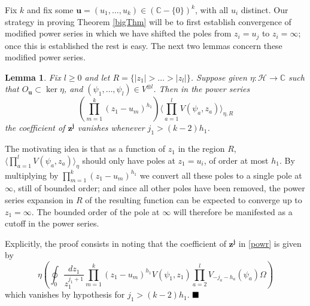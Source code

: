 \documentclass[a4paper,12pt]{article}
\newcommand{\C}{{\mathbb C}}
\newcommand{\uu}{{\mathbf u}}
\newcommand{\jj}{{\mathbf j}}
\newcommand{\zz}{{\mathbf z}}
\newcommand{\F}{{\mathcal H}}
\newcommand{\abs}[1]{\lvert#1\rvert}
\newcommand{\IP}[1]{\langle#1\rangle}
\newcommand{\done}{$\hfill \hfill \blacksquare$ \bigskip}
\newcommand{\ci}{\oint}
\newtheorem{lem}[defn]{Lemma}
\newcommand{\oproof}[1]{\noindent {\bf Proof#1.\ }}
\begin{document}
Fix $k$ and fix some $\uu = (u_1, \dots, u_k) \in (\C-\{0\})^k$, with all $u_i$ distinct.  Our strategy in proving
Theorem \ref{bigThm} will be to first establish convergence of modified power series
in which we have shifted the poles from $z_i = u_j$ to $z_i = \infty$; once this is established the rest
is easy.  The next two lemmas concern these modified power series.

\begin{lem} \label{pL} Fix $l \ge 0$ and let $R = \{\abs{z_1} > \dots > \abs{z_l}\}$.  Suppose given $\eta: \F \to \C$ such that $O_\uu \subset \ker \eta$, and
$(\psi_1, \dots, \psi_l) \in V^{\otimes l}$.  Then in the power series
\begin{equation} \label{powr}
\left( \prod_{m=1}^k (z_1 - u_m)^{h_1} \right) \IP{\prod_{a=1}^l V(\psi_a, z_a)}_{\eta,R}
\end{equation}
the coefficient of $\zz^\jj$ vanishes whenever $j_1 > (k-2) h_1$.
\end{lem}
\oproof{} The motivating idea is that as a function of $z_1$ in the region $R$,
$\IP{\prod_{a=1}^l V(\psi_a, z_a)}_\eta$ should only have poles at $z_1 = u_i$, of order at 
most $h_1$.  By multiplying by $\prod_{m=1}^k (z_1 - u_m)^{h_1}$ we convert all these poles to a single pole at $\infty$, still
of bounded order; and since all other poles have been removed, the power series expansion in $R$ of the
resulting function can be expected
to converge up to $z_1 = \infty$.  The bounded order of the pole at $\infty$ will therefore be manifested as a cutoff in
the power series.

Explicitly, the proof consists in noting that the coefficient of $\zz^\jj$ in \eqref{powr} is given by
\begin{equation}
\eta \left( \ci_0 \frac{dz_1}{z_1^{j_1+1}} \prod_{m=1}^k (z_1 - u_m)^{h_1} V(\psi_1, z_1) \prod_{a=2}^l V_{-j_a - h_a}(\psi_a) \Omega \right)
\end{equation}
which vanishes by hypothesis for $j_1 > (k-2) h_1$. \done
\end{document}

